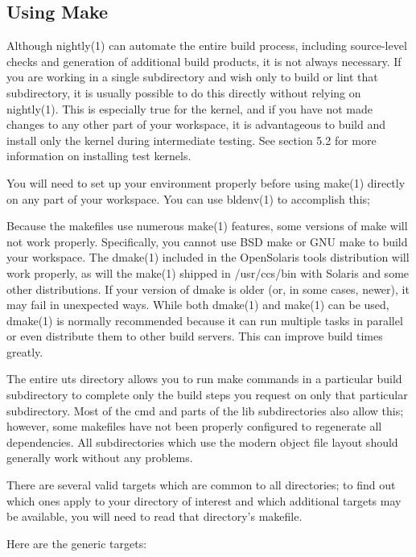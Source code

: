 \documentclass{article}
\begin{document}
\subsection*{Using Make}

Although nightly(1) can automate the entire build process, including
source-level checks and generation of additional build products, it is not
always necessary. If you are working in a single subdirectory and wish only to
build or lint that subdirectory, it is usually possible to do this directly
without relying on nightly(1). This is especially true for the kernel, and if
you have not made changes to any other part of your workspace, it is
advantageous to build and install only the kernel during intermediate
testing. See section 5.2 for more information on installing test kernels.

You will need to set up your environment properly before using make(1) directly
on any part of your workspace. You can use bldenv(1) to accomplish this;

Because the makefiles use numerous make(1) features, some versions of make will
not work properly. Specifically, you cannot use BSD make or GNU make to build
your workspace. The dmake(1) included in the OpenSolaris tools distribution will
work properly, as will the make(1) shipped in /usr/ccs/bin with Solaris and some
other distributions. If your version of dmake is older (or, in some cases,
newer), it may fail in unexpected ways. While both dmake(1) and make(1) can be
used, dmake(1) is normally recommended because it can run multiple tasks in
parallel or even distribute them to other build servers. This can improve build
times greatly.

The entire uts directory allows you to run make commands in a particular build
subdirectory to complete only the build steps you request on only that
particular subdirectory. Most of the cmd and parts of the lib subdirectories
also allow this; however, some makefiles have not been properly configured to
regenerate all dependencies. All subdirectories which use the modern object file
layout should generally work without any problems.

There are several valid targets which are common to all directories; to find
out which ones apply to your directory of interest and which additional targets
may be available, you will need to read that directory's makefile.

Here are the generic targets:
\end{document}
